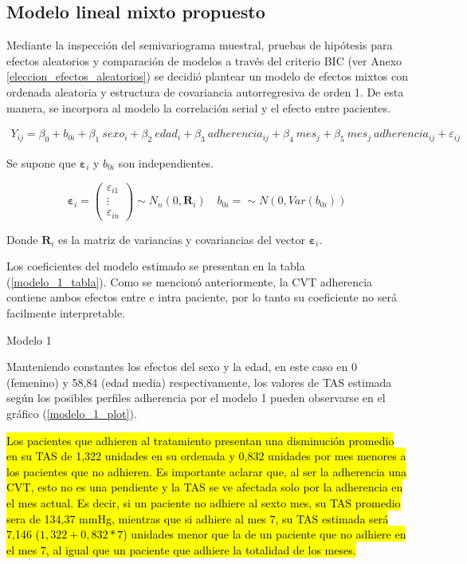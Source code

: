 \documentclass[spanish]{article}
\numberwithin{figure}{subsection}
\numberwithin{equation}{subsection}
\numberwithin{table}{subsection}
\begin{document}
\subsection{Modelo lineal mixto propuesto}

Mediante la inspección del semivariograma muestral, pruebas de hipótesis para
efectos aleatorios y comparación de modelos a través del criterio BIC (ver Anexo
\ref{eleccion_efectos_aleatorios}) se decidió plantear un modelo de efectos
mixtos con ordenada aleatoria y estructura de covariancia autorregresiva de
orden 1. De esta manera, se incorpora al modelo la correlación serial y el
efecto entre pacientes.

\begin{multline}
	\label{modelo_1}
	Y_{ij} = \beta_0 + b_{0i} + \beta_1\ sexo_i + \beta_2\ edad_i + \beta_3\ adherencia_{ij}
	+ \beta_4\ mes_j + \beta_5\ mes_j\ adherencia_{ij} + \varepsilon_{ij}
\end{multline}

Se supone que $\bm{\varepsilon}_i$ y $b_{0i}$ son independientes.

\[ 
	\bm{\varepsilon}_i = \begin{pmatrix} \varepsilon_{i1} \\ \vdots \\ \varepsilon_{in} \end{pmatrix} \sim N_{n}(0, \bm{R}_i)
	\quad
	b_{0i} = \sim N(0, Var(b_{0i}))
\]

Donde $\bm{R}_i$ es la matriz de variancias y covariancias del vector
$\bm{\varepsilon}_i$.

Los coeficientes del modelo estimado se presentan en la tabla
(\ref{modelo_1_tabla}). Como se mencionó anteriormente, la CVT adherencia contiene
ambos efectos entre e intra paciente, por lo tanto su coeficiente no será
facilmente interpretable. 

\begin{table}[H]
	\centering
	\caption{Modelo 1}
	\label{modelo_1_tabla}
	
\end{table}

Manteniendo constantes los efectos del sexo y la edad, en este caso en 0
(femenino) y 58,84 (edad media) respectivamente, los valores de TAS estimada
según los posibles perfiles adherencia por el modelo 1 pueden observarse en el
gráfico (\ref{modelo_1_plot}).

\hl{Los pacientes que adhieren al tratamiento presentan una disminución promedio
en su TAS de 1,322 unidades en su ordenada y 0,832 unidades por mes menores a
los pacientes que no adhieren. Es importante aclarar que, al ser la adherencia
una CVT, esto no es una pendiente y la TAS se ve afectada solo por la adherencia
en el mes actual. Es decir, si un paciente no adhiere al sexto mes, su TAS
promedio sera de 134,37 mmHg, mientras que si adhiere al mes 7, su TAS estimada
será 7,146 ($1,322 + 0,832 * 7$) unidades menor que la de un paciente que no
adhiere en el mes 7, al igual que un paciente que adhiere la totalidad de los
meses.}
\end{document}
